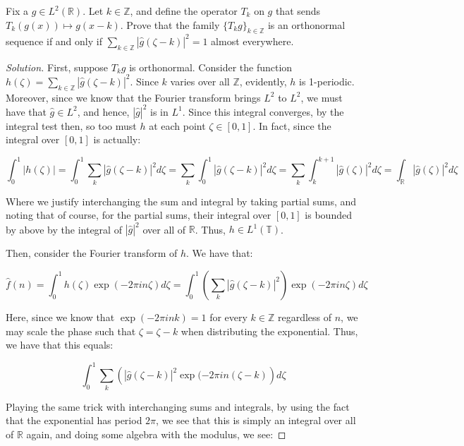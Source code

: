 \documentclass[10pt]{article}
\newenvironment{problem}[2][]{\begin{trivlist}
\item[\hskip \labelsep {\bfseries #1}\hskip \labelsep {\bfseries #2.}]}{\end{trivlist}}
\begin{document}
\begin{problem}{Question 12}

Fix a $g \in L^2(\mathbb{R})$. Let $k \in \mathbb{Z}$, and define the operator $T_k$ on $g$ that sends $T_k (g(x)) \mapsto g(x - k)$. Prove that the family $\{ T_k g \}_{k \in \mathbb{Z}}$ is an orthonormal sequence if and only if $\sum_{k \in \mathbb{Z}} | \hat{g}(\zeta - k)|^2 = 1$ almost everywhere.

\end{problem}

\begin{proof}[Solution]

First, suppose $T_k g$ is orthonormal. Consider the function $h(\zeta) = \sum_{k \in \mathbb{Z}} | \hat{g}(\zeta - k)|^2$. Since $k$ varies over all $\mathbb{Z}$, evidently, $h$ is 1-periodic. Moreover, since we know that the Fourier transform brings $L^2$ to $L^2$, we must have that $\hat{g} \in L^2$, and hence, $|\hat{g}|^2$ is in $L^1$. Since this integral converges, by the integral test then, so too must $h$ at each point $\zeta \in [0,1]$. In fact, since the integral over $[0,1]$ is actually:

$$\int_0^1 |h(\zeta)| = \int_0^1 \sum_{k} | \hat{g}(\zeta - k) |^2 d\zeta = \sum_{k} \int_0^1 | \hat{g}(\zeta - k )|^2 d\zeta = \sum_{k} \int_k^{k+1} | \hat{g}(\zeta)|^2 d\zeta = \int_{\mathbb{R}} |\hat{g}(\zeta)|^2 d\zeta$$

Where we justify interchanging the sum and integral by taking partial sums, and noting that of course, for the partial sums, their integral over $[0,1]$ is bounded by above by the integral of $|\hat{g}|^2$ over all of $\mathbb{R}$. Thus, $h \in L^1(\mathbb{T})$.

Then, consider the Fourier transform of $h$. We have that:

$$ \hat{f}(n) = \int_0^1 h(\zeta) \exp(-2 \pi i n \zeta) d\zeta = \int_0^1 \left (\sum_{k} |\hat{g}(\zeta - k)|^2 \right) \exp(-2 \pi i n \zeta) d\zeta $$ 

Here, since we know that $\exp(-2\pi i nk) = 1$ for every $k \in \mathbb{Z}$ regardless of $n$, we may scale the phase such that $\zeta = \zeta - k$ when distributing the exponential. Thus, we have that this equals:

$$ \int_0^1 \sum_{k} \left( |\hat{g}(\zeta - k)|^2 \exp(-2 \pi in (\zeta - k) \right) d\zeta $$

Playing the same trick with interchanging sums and integrals, by using the fact that the exponential has period $2\pi$, we see that this is simply an integral over all of $\mathbb{R}$ again, and doing some algebra with the modulus, we see:


\end{proof}
\end{document}
